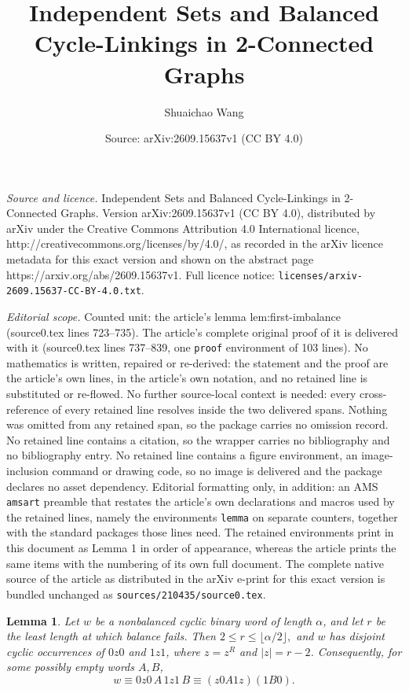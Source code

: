 \documentclass[10pt,a4paper]{amsart}
\title{Independent Sets and Balanced Cycle-Linkings in 2-Connected Graphs}
\author{Shuaichao Wang}
\date{Source: arXiv:2609.15637v1 (CC BY 4.0)}
\newtheorem{lemma}{Lemma}
\begin{document}
\maketitle

\noindent\emph{Source and licence.} Independent Sets and Balanced Cycle-Linkings in 2-Connected Graphs. Version arXiv:2609.15637v1 (CC BY 4.0), distributed by arXiv under the Creative Commons Attribution 4.0 International licence, http://creativecommons.org/licenses/by/4.0/, as recorded in the arXiv licence metadata for this exact version and shown on the abstract page https://arxiv.org/abs/2609.15637v1. Full licence notice: \texttt{licenses/arxiv-2609.15637-CC-BY-4.0.txt}.\par\smallskip

\noindent\textit{Editorial scope.} Counted unit: the article's lemma lem:first-imbalance (source0.tex lines 723--735). The article's complete original proof of it is delivered with it (source0.tex lines 737--839, one \texttt{proof} environment of 103 lines). No mathematics is written, repaired or re-derived: the statement and the proof are the article's own lines, in the article's own notation, and no retained line is substituted or re-flowed.  No further source-local context is needed: every cross-reference of every retained line resolves inside the two delivered spans.  Nothing was omitted from any retained span, so the package carries no omission record.  No retained line contains a citation, so the wrapper carries no bibliography and no bibliography entry.  No retained line contains a figure environment, an image-inclusion command or drawing code, so no image is delivered and the package declares no asset dependency.  Editorial formatting only, in addition: an AMS \texttt{amsart} preamble that restates the article's own declarations and macros used by the retained lines, namely the environments \texttt{lemma} on separate counters, together with the standard packages those lines need.  The retained environments print in this document as Lemma 1 in order of appearance, whereas the article prints the same items with the numbering of its own full document.  The complete native source of the article as distributed in the arXiv e-print for this exact version is bundled unchanged as \texttt{sources/210435/source0.tex}.
\begin{lemma}\label{lem:first-imbalance}
Let $w$ be a nonbalanced cyclic binary word of length $\alpha$, and
let $r$ be the least length at which balance fails. Then
$
2\le r\le\lfloor\alpha/2\rfloor,
$
and $w$ has disjoint cyclic occurrences of $0z0$ and $1z1$, where
$z=z^R$ and $|z|=r-2$. Consequently, for some possibly empty words
$A,B$,
\begin{equation}\label{eq:obstruction-decomposition}
w\equiv 0z0\,A\,1z1\,B\equiv (z0A1z)(1B0).
\end{equation}
\end{lemma}
\end{document}
